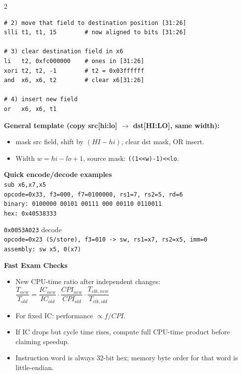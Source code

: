 \documentclass[10pt]{article}
\newcommand{\hdr}[1]{\vspace{2pt}\textbf{#1}\vspace{1pt}\\}
\begin{document}
\begin{multicols}{2}
\begin{verbatim}
# 2) move that field to destination position [31:26]
slli t1, t1, 15        # now aligned to bits [31:26]

# 3) clear destination field in x6
li   t2, 0xfc000000    # ones in [31:26]
xori t2, t2, -1        # t2 = 0x03ffffff
and  x6, x6, t2        # clear x6[31:26]

# 4) insert new field
or   x6, x6, t1
\end{verbatim}
\footnotesize

\textbf{General template (copy src[hi:lo] $\rightarrow$ dst[HI:LO], same width):}
\begin{itemize}
\item mask src field, shift by $(HI-hi)$, clear dst mask, OR insert.
\item Width $w=hi-lo+1$, source mask: \texttt{((1<<w)-1)<<lo}.
\end{itemize}

\hdr{Quick encode/decode examples}
\scriptsize
\texttt{sub x6,x7,x5}\\
\texttt{opcode=0x33, f3=000, f7=0100000, rs1=7, rs2=5, rd=6}\\
\texttt{binary: 0100000 00101 00111 000 00110 0110011}\\
\texttt{hex: 0x40538333}

\texttt{0x0053A023} decode\\
\texttt{opcode=0x23 (S/store), f3=010 -> sw, rs1=x7, rs2=x5, imm=0}\\
\texttt{assembly: sw x5, 0(x7)}
\footnotesize

\hdr{Fast Exam Checks}
\begin{itemize}
\item New CPU-time ratio after independent changes:
$\dfrac{T_{new}}{T_{old}}=\dfrac{IC_{new}}{IC_{old}}\cdot\dfrac{CPI_{new}}{CPI_{old}}\cdot\dfrac{T_{clk,new}}{T_{clk,old}}$
\item For fixed IC: performance $\propto f/CPI$.
\item If IC drops but cycle time rises, compute full CPU-time product before claiming speedup.
\item Instruction word is always 32-bit hex; memory byte order for that word is little-endian.
\end{itemize}

\end{multicols}
\end{document}
